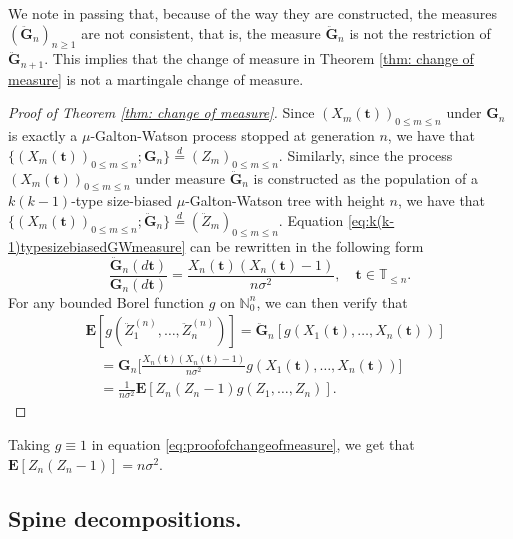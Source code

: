 \documentclass[12pt,a4paper]{amsart}
\numberwithin{equation}{section}
\begin{document}
	We note in passing that, because of the way they are constructed, the measures $(\ddot{\mathbf G}_n)_{n\ge 1}$ are not consistent, that is, the measure $\ddot{\mathbf G}_n$ is not the restriction of $\ddot{\mathbf G}_{n+1}$. 
	This implies that the change of measure in Theorem \ref{thm: change of measure} is not a martingale change of measure.
\medskip
\begin{proof}[Proof of Theorem \ref{thm: change of measure}]
	Since $(X_m( \mathbf t ))_{0\le m\le n}$ under ${\mathbf G}_n$ is exactly a $\mu$-Galton-Watson process stopped at generation $n$, we have that $\{(X_m( \mathbf t ))_{0\le m\le n}; {\mathbf G}_n\}  \overset{d}{=} (Z_m)_{0\le m\le n}.$
    Similarly, since the process $(X_m( \mathbf t ))_{0\le m\le n}$ under measure $\ddot{\mathbf G}_n$ is constructed as the population of a $k(k-1)$-type size-biased $\mu$-Galton-Watson tree with height $n$, we have that $\{(X_m( \mathbf t ))_{0\le m\le n};\ddot{\mathbf G}_n\}  \overset{d}{=} (\ddot Z_m)_{0\le m\le n}.$
	Equation \eqref{eq:k(k-1)typesizebiasedGWmeasure} can be rewritten in the following form
\begin{equation*}
    	\frac{\ddot{\mathbf G}_n(d \mathbf t )}{\mathbf G_n (d \mathbf t ) }
    =
    	\frac{X_n( \mathbf t )(X_n( \mathbf t )-1)}{n\sigma^2},
    \quad
    	 \mathbf t \in \mathbb T_{\leq n}.
\end{equation*}
    For any bounded Borel function $g$ on $\mathbb N_0^n$, we can then verify that
\begin{equation} \label{eq:proofofchangeofmeasure}
\begin{split}
	&\mathbf E [ g ( \ddot Z_1^{(n)}, \dots, \ddot Z_n^{(n)})]
	= \ddot{\mathbf G}_n [g ( X_1(  \mathbf t ), \dots, X_n(  \mathbf t ))]
    \\ &\quad = {\mathbf G}_n \big[ \frac { X_n( \mathbf t ) ( X_n( \mathbf t ) - 1)} {n \sigma^2} g (X_1( \mathbf t ), \dots, X_n( \mathbf t ))\big]
	\\&\quad = \frac { 1} { n \sigma^2} \mathbf E[ Z_n ( Z_n - 1) g( Z_1, \dots, Z_n)].
\end{split}
\end{equation}
\end{proof}
	Taking $g\equiv 1$ in equation \eqref{eq:proofofchangeofmeasure}, we get that $\mathbf E [Z_n(Z_n-1)]=n\sigma^2$.	
\subsection{Spine decompositions.}
\label{sec:spinesdecomposition}
\end{document}
